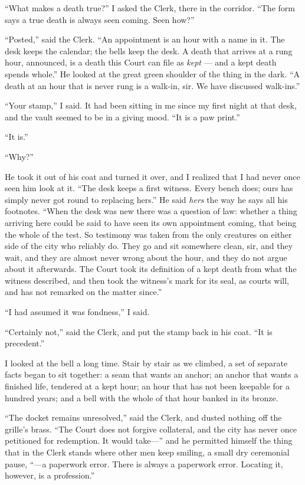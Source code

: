 ``What makes a death true?'' I asked the Clerk, there in the corridor. ``The form says a true death is always seen coming. Seen how?''

``Posted,'' said the Clerk. ``An appointment is an hour with a name in it. The desk keeps the calendar; the bells keep the desk. A death that arrives at a rung hour, announced, is a death this Court can file as \emph{kept} --- and a kept death spends whole.'' He looked at the great green shoulder of the thing in the dark. ``A death at an hour that is never rung is a walk-in, sir. We have discussed walk-ins.''

``Your stamp,'' I said. It had been sitting in me since my first night at that desk, and the vault seemed to be in a giving mood. ``It is a paw print.''

``It is.''

``Why?''

He took it out of his coat and turned it over, and I realized that I had never once seen him look at it. ``The desk keeps a first witness. Every bench does; ours has simply never got round to replacing hers.'' He said \emph{hers} the way he says all his footnotes. ``When the desk was new there was a question of law: whether a thing arriving here could be said to have seen its own appointment coming, that being the whole of the test. So testimony was taken from the only creatures on either side of the city who reliably do. They go and sit somewhere clean, sir, and they wait, and they are almost never wrong about the hour, and they do not argue about it afterwards. The Court took its definition of a kept death from what the witness described, and then took the witness's mark for its seal, as courts will, and has not remarked on the matter since.''

``I had assumed it was fondness,'' I said.

``Certainly not,'' said the Clerk, and put the stamp back in his coat. ``It is precedent.''

I looked at the bell a long time. Stair by stair as we climbed, a set of separate facts began to sit together: a seam that wants an anchor; an anchor that wants a finished life, tendered at a kept hour; an hour that has not been keepable for a hundred years; and a bell with the whole of that hour banked in its bronze.

``The docket remains unresolved,'' said the Clerk, and dusted nothing off the grille's brass. ``The Court does not forgive collateral, and the city has never once petitioned for redemption. It would take---'' and he permitted himself the thing that in the Clerk stands where other men keep smiling, a small dry ceremonial pause, ``---a paperwork error. There is always a paperwork error. Locating it, however, is a profession.''

